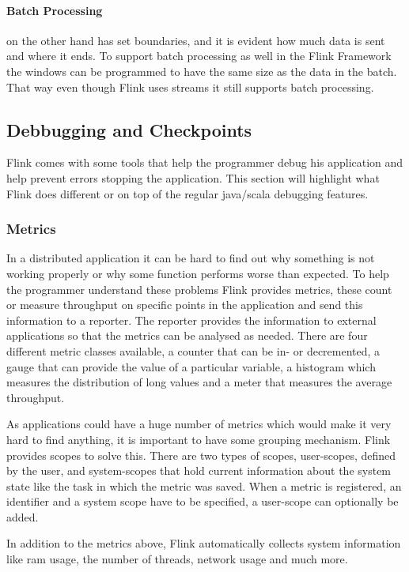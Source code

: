 \paragraph{Batch Processing} on the other hand has set boundaries, and it is evident how much data is sent and where it ends. To support batch processing as well in the Flink Framework the windows can be programmed to have the same size as the data in the batch. That way even though Flink uses streams it still supports batch processing.

\subsection{Debbugging and Checkpoints}
\label{debuggingAndCheckpoints}
Flink comes with some tools that help the programmer debug his application and help prevent errors stopping the application. This section will highlight what Flink does different or on top of the regular java/scala debugging features.

\subsubsection{Metrics}
\label{metrics}
In a distributed application it can be hard to find out why something is not working properly or why some function performs worse than expected. To help the programmer understand these problems Flink provides metrics, these count or measure throughput on specific points in the application and send this information to a reporter. The reporter provides the information to external applications so that the metrics can be analysed as needed. There are four different metric classes available, a counter that can be in- or decremented, a gauge that can provide the value of a particular variable, a histogram which measures the distribution of long values and a meter that measures the average throughput.

As applications could have a huge number of metrics which would make it very hard to find anything, it is important to have some grouping mechanism. Flink provides scopes to solve this. There are two types of scopes, user-scopes, defined by the user, and system-scopes that hold current information about the system state like the task in which the metric was saved. When a metric is registered, an identifier and a system scope have to be specified, a user-scope can optionally be added.

In addition to the metrics above, Flink automatically collects system information like ram usage, the number of threads, network usage and much more.

